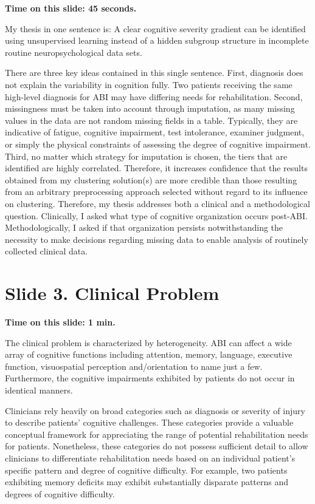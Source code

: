 \documentclass[
  11pt,
]{article}
\begin{document}
\textbf{Time on this slide: 45 seconds.}

My thesis in one sentence is: A clear cognitive severity gradient can be
identified using unsupervised learning instead of a hidden subgroup
structure in incomplete routine neuropsychological data sets.

There are three key ideas contained in this single sentence. First,
diagnosis does not explain the variability in cognition fully. Two
patients receiving the same high-level diagnosis for ABI may have
differing needs for rehabilitation. Second, missingness must be taken
into account through imputation, as many missing values in the data are
not random missing fields in a table. Typically, they are indicative of
fatigue, cognitive impairment, test intolerance, examiner judgment, or
simply the physical constraints of assessing the degree of cognitive
impairment. Third, no matter which strategy for imputation is chosen,
the tiers that are identified are highly correlated. Therefore, it
increases confidence that the results obtained from my clustering
solution(s) are more credible than those resulting from an arbitrary
preprocessing approach selected without regard to its influence on
clustering. Therefore, my thesis addresses both a clinical and a
methodological question. Clinically, I asked what type of cognitive
organization occurs post-ABI. Methodologically, I asked if that
organization persists notwithstanding the necessity to make decisions
regarding missing data to enable analysis of routinely collected
clinical data.

\section{Slide 3. Clinical Problem}\label{slide-3.-clinical-problem}

\textbf{Time on this slide: 1 min.}

The clinical problem is characterized by heterogeneity. ABI can affect a
wide array of cognitive functions including attention, memory, language,
executive function, visuospatial perception and/orientation to name just
a few. Furthermore, the cognitive impairments exhibited by patients do
not occur in identical manners.

Clinicians rely heavily on broad categories such as diagnosis or
severity of injury to describe patients' cognitive challenges. These
categories provide a valuable conceptual framework for appreciating the
range of potential rehabilitation needs for patients. Nonetheless, these
categories do not possess sufficient detail to allow clinicians to
differentiate rehabilitation needs based on an individual patient's
specific pattern and degree of cognitive difficulty. For example, two
patients exhibiting memory deficits may exhibit substantially disparate
patterns and degrees of cognitive difficulty.
\end{document}
